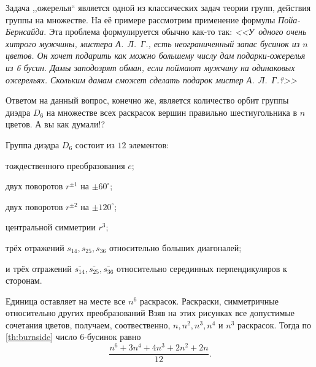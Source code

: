 \begin{example}[Ожерелья]
    Задача ,,ожерелья`` является одной из классических задач теории групп, действия группы на множестве. На её примере рассмотрим применение формулы \emph{Пойа-Бернсайда}. Эта проблема формулируется обычно как-то так: \emph{<<У~одного очень хитрого мужчины, мистера А.~Л.~Г., есть неограниченный запас бусинок из $n$ цветов. Он хочет подарить как можно большему числу дам подарки-ожерелья из 6 бусин. Дамы заподозрят обман, если поймают мужчину на одинаковых ожерельях. Скольким дамам сможет сделать подарок мистер А.~Л.~Г.?>>}

    Ответом на данный вопрос, конечно же, является количество орбит группы диэдра $D_6$ на множестве всех раскрасок вершин правильно шестиугольника в $n$ цветов. А вы как думали!?

    Группа диэдра $D_6$ состоит из $12$ элементов: \begin{bullets}
        \item тождественного преобразования $e$; 
        \item двух поворотов $r^{\pm 1}$ на $\pm 60^\circ$;
        \item двух поворотов $r^{\pm 2}$ на $\pm 120^\circ$;
        \item центральной симметрии $r^3$;
        \item трёх отражений $s_{14}, s_{25}, s_{36}$ относительно больших диагоналей;
        \item и трёх отражений $\bar{s_{14}}, \bar{s_{25}}, \bar{s_{36}}$ относительно серединных перпендикуляров к сторонам.
    \end{bullets}
    Единица оставляет на месте все $n^6$ раскрасок. Раскраски, симметричные относительно других преобразований %
    Взяв на этих рисунках все допустимые сочетания цветов, получаем, соотвественно, $n, n^2, n^3, n^4$ и $n^3$ раскрасок. Тогда по \cref{th:burnside} число 6-бусинок равно \[\frac{n^6 + 3n^4 +4n^3+2n^2+2n}{12}.\]
\end{example}

